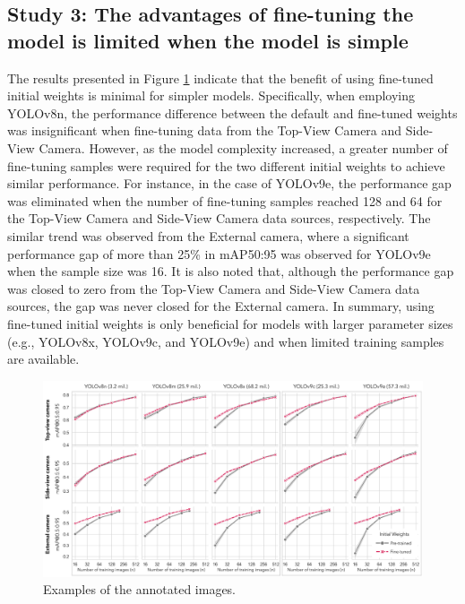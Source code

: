 \subsection*{Study 3: The advantages of fine-tuning the model is limited when the model is simple}

The results presented in Figure \ref{fig:finetune} indicate that the benefit of using fine-tuned initial weights is minimal for simpler models. Specifically, when employing YOLOv8n, the performance difference between the default and fine-tuned weights was insignificant when fine-tuning data from the Top-View Camera and Side-View Camera. However, as the model complexity increased, a greater number of fine-tuning samples were required for the two different initial weights to achieve similar performance. For instance, in the case of YOLOv9e, the performance gap was eliminated when the number of fine-tuning samples reached 128 and 64 for the Top-View Camera and Side-View Camera data sources, respectively. The similar trend was observed from the External camera, where a significant performance gap of more than 25\% in mAP50:95 was observed for YOLOv9e when the sample size was 16. It is also noted that, although the performance gap was closed to zero from the Top-View Camera and Side-View Camera data sources, the gap was never closed for the External camera. In summary, using fine-tuned initial weights is only beneficial for models with larger parameter sizes (e.g., YOLOv8x, YOLOv9c, and YOLOv9e) and when limited training samples are available.

\begin{figure}[H]
    \centering
    \includegraphics[width=1\textwidth]{figure_5.jpg}
    \caption{Examples of the annotated images.}
    \label{fig:finetune}
\end{figure}

